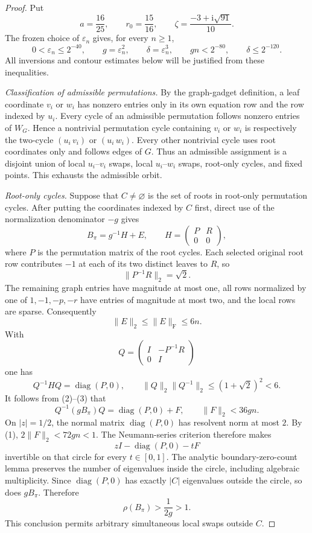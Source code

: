 \documentclass{article}
\begin{document}
\begin{proof}
Put
\[
 a=\frac{16}{25},\qquad r_0=\frac{15}{16},\qquad
 \zeta=\frac{-3+\mathrm i\sqrt{91}}{10}.
\]
The frozen choice of \(\varepsilon_n\) gives, for every \(n\geq1\),
\[
 0<\varepsilon_n\leq2^{-40},\qquad
 g=\varepsilon_n^2,\qquad
 \delta=\varepsilon_n^3,\qquad
 gn<2^{-80},\qquad
 \delta\leq2^{-120}.
\tag{1}
\]
All inversions and contour estimates below will be justified from these inequalities.

\emph{Classification of admissible permutations.}
By the graph-gadget definition, a leaf coordinate \(v_i\) or \(w_i\) has nonzero entries only in its own equation row and the row indexed by \(u_i\). Every cycle of an admissible permutation follows nonzero entries of \(W_G\). Hence a nontrivial permutation cycle containing \(v_i\) or \(w_i\) is respectively the two-cycle \((u_i\,v_i)\) or \((u_i\,w_i)\). Every other nontrivial cycle uses root coordinates only and follows edges of \(G\). Thus an admissible assignment is a disjoint union of local \(u_i\)--\(v_i\) swaps, local \(u_i\)--\(w_i\) swaps, root-only cycles, and fixed points. This exhausts the admissible orbit.

\emph{Root-only cycles.}
Suppose that \(C\neq\varnothing\) is the set of roots in root-only permutation cycles. After putting the coordinates indexed by \(C\) first, direct use of the normalization denominator \(-g\) gives
\[
 B_\pi=g^{-1}H+E,\qquad
 H=\begin{pmatrix}P&R\\0&0\end{pmatrix},
\tag{2}
\]
where \(P\) is the permutation matrix of the root cycles. Each selected original root row contributes \(-1\) at each of its two distinct leaves to \(R\), so
\[
 \|P^{-1}R\|_2=\sqrt2.
\]
The remaining graph entries have magnitude at most one, all rows normalized by one of \(1,-1,-p,-r\) have entries of magnitude at most two, and the local rows are sparse. Consequently
\[
 \|E\|_2\leq\|E\|_{\mathrm F}\leq6n.
\tag{3}
\]
With
\[
 Q=\begin{pmatrix}I&-P^{-1}R\\0&I\end{pmatrix}
\]
one has
\[
 Q^{-1}HQ=\operatorname{diag}(P,0),
 \qquad
 \|Q\|_2\|Q^{-1}\|_2
 \leq(1+\sqrt2)^2<6.
\]
It follows from (2)--(3) that
\[
 Q^{-1}(gB_\pi)Q=\operatorname{diag}(P,0)+F,
 \qquad \|F\|_2<36gn.
\]
On \(|z|=1/2\), the normal matrix \(\operatorname{diag}(P,0)\) has resolvent norm at most \(2\). By (1), \(2\|F\|_2<72gn<1\). The Neumann-series criterion therefore makes
\[
 zI-\operatorname{diag}(P,0)-tF
\]
invertible on that circle for every \(t\in[0,1]\). The analytic boundary-zero-count lemma preserves the number of eigenvalues inside the circle, including algebraic multiplicity. Since \(\operatorname{diag}(P,0)\) has exactly \(|C|\) eigenvalues outside the circle, so does \(gB_\pi\). Therefore
\[
 \rho(B_\pi)>\frac1{2g}>1.
\tag{4}
\]
This conclusion permits arbitrary simultaneous local swaps outside \(C\).


\end{proof}
\end{document}
